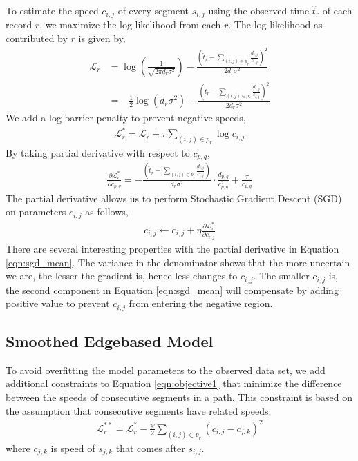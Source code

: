 \documentclass{sig-alternate}
\begin{document}
To estimate the speed $c_{i,j}$ of every segment $s_{i,j}$ using the observed time $\hat{t}_r$ of each record $r$, we maximize the log likelihood from each $r$. The log likelihood as contributed by $r$ is given by,
\begin{align*}
	\mathcal{L}_r &= \log \left( \frac{1}{\sqrt{2 \pi d_r \sigma^2 }} \right) - \frac{\left( \hat{t}_r - \sum_{ (i,j) \in p_r } \frac{d_{i,j}}{c_{i,j}} \right)^2}{2 d_r \sigma^2 } \\
	&= - \frac{1}{2} \log \left( d_r \sigma^2 \right) - \frac{\left( \hat{t}_r - \sum_{ (i,j) \in p_r } \frac{d_{i,j}}{c_{i,j}} \right)^2}{2 d_r \sigma^2 }
\end{align*}
We add a log barrier penalty to prevent negative speeds,
\begin{align}
	\label{eqn:objective1}
	\mathcal{L}^*_r = \mathcal{L}_r + \tau \sum_{(i,j) \in p_r} \log c_{i,j}
\end{align}
By taking partial derivative with respect to $c_{p,q}$,
\begin{align}
	\label{eqn:sgd_mean}
	\frac{\partial \mathcal{L}^*_r}{\partial c_{p,q}} = - \frac{\left( \hat{t}_r - \sum_{ (i,j) \in p_r } \frac{d_{i,j}}{c_{i,j}} \right)}{d_r \sigma^2 } \cdot \frac{d_{p,q}}{c_{p,q}^2} + \frac{\tau}{c_{p,q}}
\end{align}
The partial derivative allows us to perform Stochastic Gradient Descent (SGD) on parameters $c_{i,j}$ as follows,
\begin{align*}
	c_{i,j} \leftarrow c_{i,j} + \eta \frac{\partial \mathcal{L}^*_r}{\partial c_{i,j}}
\end{align*}
There are several interesting properties with the partial derivative in Equation \ref{eqn:sgd_mean}. The variance in the denominator shows that the more uncertain we are, the lesser the gradient is, hence less changes to $c_{i,j}$. The smaller $c_{i,j}$ is, the second component in Equation \ref{eqn:sgd_mean} will compensate by adding positive value to prevent $c_{i,j}$ from entering the negative region.

\subsection{Smoothed Edgebased Model}

To avoid overfitting the model parameters to the observed data set, we add additional constraints to Equation \ref{eqn:objective1} that minimize the difference between the speeds of consecutive segments in a path. This constraint is based on the assumption that consecutive segments have related speeds.
\begin{align*}
	\mathcal{L}^{**}_r = \mathcal{L}^*_r - \frac{\psi}{2} \sum_{(i,j) \in p_r} \left( c_{i,j} - c_{j,k} \right)^2
\end{align*}
where $c_{j,k}$ is speed of $s_{j,k}$ that comes after $s_{i,j}$.
\end{document}
